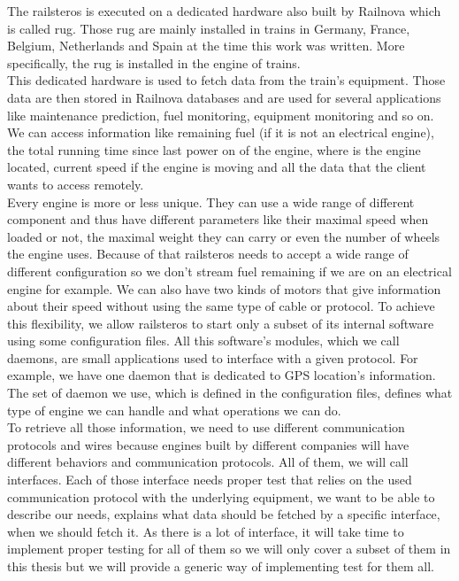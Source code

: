 \documentclass[12pt]{article}
\theoremstyle{definition}
\theoremstyle{definition}
\theoremstyle{remark}
\begin{document}
The \gls{railsteros} is executed on a dedicated hardware also built by Railnova which is called \gls{rug}. Those \gls{rug} are mainly installed in trains in Germany, France, Belgium, Netherlands and Spain at the time this work was written. More specifically, the \gls{rug} is installed in the engine of trains.\\

This dedicated hardware is used to fetch data from the train's equipment. Those data are then stored in Railnova databases and are used for several applications like maintenance prediction, fuel monitoring, equipment monitoring and so on. We can access information like remaining fuel (if it is not an electrical engine), the total running time since last power on of the engine, where is the engine located, current speed if the engine is moving and all the data that the client wants to access remotely.\\

Every engine is more or less unique. They can use a wide range of different component and thus have different parameters like their maximal speed when loaded or not, the maximal weight they can carry or even the number of wheels the engine uses. Because of that \gls{railsteros} needs to accept a wide range of different configuration so we don't stream fuel remaining if we are on an electrical engine for example. We can also have two kinds of motors that give information about their speed without using the same type of cable or protocol. To achieve this flexibility, we allow \gls{railsteros} to start only a subset of its internal software using some configuration files. All this software's modules, which we call \gls{daemons}, are small applications used to interface with a given protocol. For example, we have one daemon that is dedicated to GPS location's information. The set of daemon we use, which is defined in the configuration files, defines what type of engine we can handle and what operations we can do.\\

To retrieve all those information, we need to use different communication protocols and wires because engines built by different companies will have different behaviors and communication protocols. All of them, we will call interfaces. Each of those interface needs proper test that relies on the used communication protocol with the underlying equipment, we want to be able to describe our needs, explains what data should be fetched by a specific interface, when we should fetch it. As there is a lot of interface, it will take time to implement proper testing for all of them so we will only cover a subset of them in this thesis but we will provide a generic way of implementing test for them all.
\end{document}
